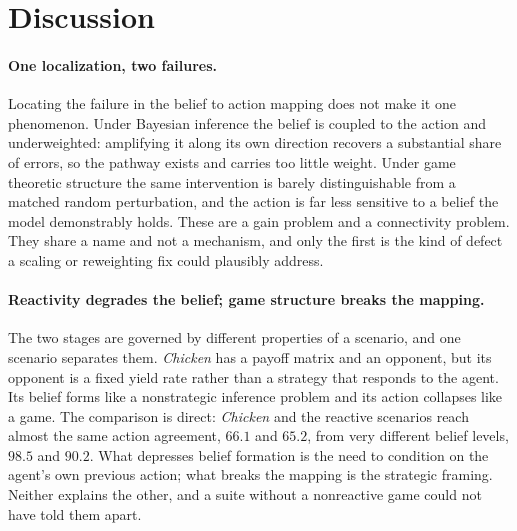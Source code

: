 
\section{Discussion}

\paragraph{One localization, two failures.}
Locating the failure in the belief to action mapping does not make it one
phenomenon. Under Bayesian inference the belief is coupled to the action and
underweighted: amplifying it along its own direction recovers a substantial
share of errors, so the pathway exists and carries too little weight. Under
game theoretic structure the same intervention is barely distinguishable from
a matched random perturbation, and the action is far less sensitive to a
belief the model demonstrably holds. These are a gain problem and a
connectivity problem. They share a name and not a mechanism, and only the
first is the kind of defect a scaling or reweighting fix could plausibly
address.

\paragraph{Reactivity degrades the belief; game structure breaks the mapping.}
The two stages are governed by different properties of a scenario, and one
scenario separates them. \textit{Chicken} has a payoff matrix and an opponent,
but its opponent is a fixed yield rate rather than a strategy that responds to
the agent. Its belief forms like a nonstrategic inference problem and its
action collapses like a game. The comparison is direct: \textit{Chicken} and
the reactive scenarios reach almost the same action agreement, \(66.1\) and
\(65.2\), from very different belief levels, \(98.5\) and \(90.2\). What
depresses belief formation is the need to condition on the agent's own
previous action; what breaks the mapping is the strategic framing. Neither
explains the other, and a suite without a nonreactive game could not have told
them apart.


